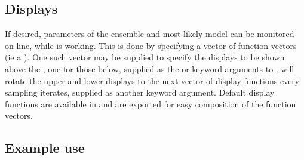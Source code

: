 \subsection{Displays}
If desired, parameters of the ensemble and most-likely model can be monitored on-line, while  is working. This is done by specifying a vector of function vectors (ie a ). One such vector may be supplied to specify the displays to be shown above the , one for those below, supplied as the  or  keyword arguments to .  will rotate the upper and lower displays to the next vector of display functions every  sampling iterates, supplied as another  keyword argument. Default display functions are available in  and are exported for easy composition of the function vectors.

\subsection{Example use}